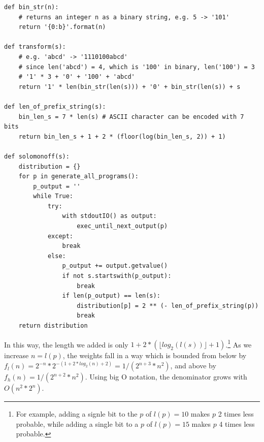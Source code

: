 \begin{lstlisting}[caption={Solomonoff induction with weights being assigned on the basis of a prefix-coded program. Note that nothing is actually being transformed into a prefix string, the only use of it is to assign weights so to guarantee our sum is $\leq 1$. The rest of the functions being referenced in the code snippet here have been introduced a few pages back and they remain unchanged.}]
def bin_str(n):
	# returns an integer n as a binary string, e.g. 5 -> '101'
	return '{0:b}'.format(n)

def transform(s):
	# e.g. 'abcd' -> '1110100abcd'
	# since len('abcd') = 4, which is '100' in binary, len('100') = 3
	# '1' * 3 + '0' + '100' + 'abcd'
	return '1' * len(bin_str(len(s))) + '0' + bin_str(len(s)) + s

def len_of_prefix_string(s):
	bin_len_s = 7 * len(s) # ASCII character can be encoded with 7 bits
	return bin_len_s + 1 + 2 * (floor(log(bin_len_s, 2)) + 1)

def solomonoff(s):
	distribution = {}
	for p in generate_all_programs():
		p_output = ''
		while True:
			try:
				with stdoutIO() as output:
					exec_until_next_output(p)
			except:
				break
			else:
				p_output += output.getvalue()
				if not s.startswith(p_output):
					break
				if len(p_output) == len(s):
					distribution[p] = 2 ** (- len_of_prefix_string(p))
					break
	return distribution
\end{lstlisting}

In this way, the length we added is only $1 + 2 * (\lfloor log_2(l(s)) \rfloor + 1)$.\footnote{For example, adding a signle bit to the $p$ of $l(p) = 10$ makes $p$ 2 times less probable, while adding a single bit to a $p$ of $l(p) = 15$ makes $p$ 4 times less probable.}
As we increase $n = l(p)$, the weights fall in a way which is bounded from below by $f_l(n) = 2^{-n} * 2^{-(1 + 2 * log_2(n) + 2)} = 1 / (2^{n+3} * n^2)$, and above by $f_h(n) = 1 / (2^{n+2} * n^2)$.
Using big O notation, the denominator grows with $O(n^2 * 2^{n})$.

\newpage

